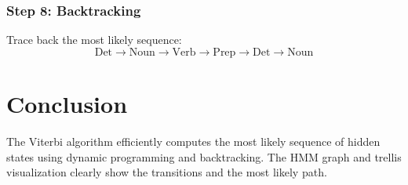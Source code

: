 \begin{notechapter}
\subsubsection{Step 8: Backtracking}
Trace back the most likely sequence:
\[
\text{Det} \rightarrow \text{Noun} \rightarrow \text{Verb} 
\rightarrow \text{Prep} \rightarrow \text{Det} \rightarrow 
\text{Noun}
\]

\section{Conclusion}
The Viterbi algorithm efficiently computes the most likely 
sequence of hidden states using dynamic programming and 
backtracking. The HMM graph and trellis visualization 
clearly show the transitions and the most likely path.
\end{notechapter}
